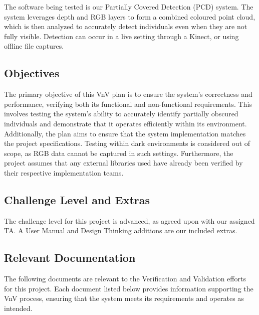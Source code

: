 \documentclass[12pt, titlepage]{article}
\begin{document}
The software being tested is our Partially Covered Detection (PCD) system. 
The system leverages depth and RGB layers to form a combined coloured point cloud, which is then analyzed to accurately detect individuals even when they are not fully visible. 
Detection can occur in a live setting through a Kinect, or using offline file captures.

\subsection{Objectives}

The primary objective of this VnV plan is to ensure the system's correctness and performance, verifying both its functional and non-functional requirements. 
This involves testing the system's ability to accurately identify partially obscured individuals and demonstrate that it operates efficiently within its environment. 
Additionally, the plan aims to ensure that the system implementation matches the project specifications. Testing within dark environments is considered out of scope, as RGB data cannot be captured in such settings. 
Furthermore, the project assumes that any external libraries used have already been verified by their respective implementation teams.

\subsection{Challenge Level and Extras}

The challenge level for this project is advanced, as agreed upon with our assigned TA. A User Manual and Design Thinking additions are our included extras.

\newpage

\subsection{Relevant Documentation}

The following documents are relevant to the Verification and Validation efforts for this project. 
Each document listed below provides information supporting the VnV process, ensuring that the system meets its requirements and operates as intended.
\end{document}
